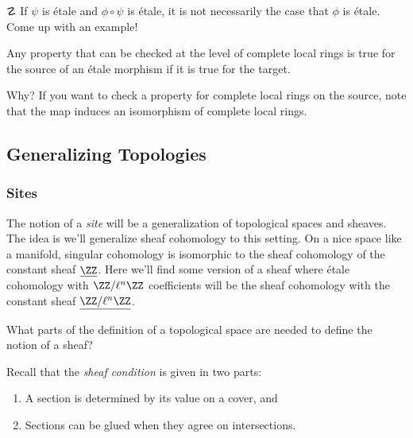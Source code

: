 \begin{exercise}[?]

\(\danger\) If \(\psi\) is étale and \(\phi\circ\psi\) is étale, it is
not necessarily the case that \(\phi\) is étale. Come up with an
example!

\end{exercise}

\begin{corollary}

Any property that can be checked at the level of complete local rings is
true for the source of an étale morphism if it is true for the target.

\end{corollary}

Why? If you want to check a property for complete local rings on the
source, note that the map induces an isomorphism of complete local
rings.

\hypertarget{generalizing-topologies}{%
\subsection{Generalizing Topologies}\label{generalizing-topologies}}

\hypertarget{sites}{%
\subsubsection{Sites}\label{sites}}

The notion of a \emph{site} will be a generalization of topological
spaces and sheaves. The idea is we'll generalize sheaf cohomology to
this setting. On a nice space like a manifold, singular cohomology is
isomorphic to the sheaf cohomology of the constant sheaf
\(\underline{\ZZ}\). Here we'll find some version of a sheaf where étale
cohomology with \(\ZZ/\ell^n\ZZ\) coefficients will be the sheaf
cohomology with the constant sheaf \(\underline{\ZZ/\ell^n\ZZ}\).

\begin{question}

What parts of the definition of a topological space are needed to define
the notion of a sheaf?

\end{question}

\begin{remark}

Recall that the \emph{sheaf condition} is given in two parts:

\begin{enumerate}
\def\labelenumi{\arabic{enumi}.}
\item
  A section is determined by its value on a cover, and
\item
  Sections can be glued when they agree on intersections.
\end{enumerate}

\end{remark}

